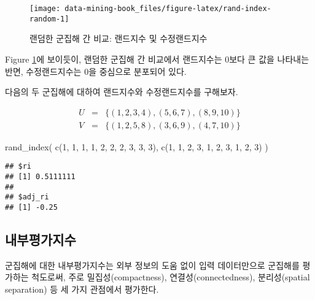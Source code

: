 \documentclass[
]{book}
\newenvironment{Shaded}{\begin{snugshade}}{\end{snugshade}}
\newcommand{\DecValTok}[1]{\textcolor[rgb]{0.00,0.00,0.81}{#1}}
\newcommand{\FunctionTok}[1]{\textcolor[rgb]{0.00,0.00,0.00}{#1}}
\newcommand{\NormalTok}[1]{#1}
\begin{document}
\begin{figure}

{\centering \texttt{[image: data-mining-book\_files/figure-latex/rand-index-random-1]} 

}

\caption{랜덤한 군집해 간 비교: 랜드지수 및 수정랜드지수}\label{fig:rand-index-random}
\end{figure}

Figure \ref{fig:rand-index-random}에 보이듯이, 랜덤한 군집해 간 비교에서 랜드지수는 0보다 큰 값을 나타내는 반면, 수정랜드지수는 0을 중심으로 분포되어 있다.

다음의 두 군집해에 대하여 랜드지수와 수정랜드지수를 구해보자.

\begin{eqnarray*}
U &=& \{(1, 2, 3, 4), (5, 6, 7), (8, 9, 10) \}\\
V &=& \{(1, 2, 5, 8), (3, 6, 9), (4, 7, 10) \}
\end{eqnarray*}

\begin{Shaded}
\begin{Highlighting}[]
\FunctionTok{rand\_index}\NormalTok{(}
  \FunctionTok{c}\NormalTok{(}\DecValTok{1}\NormalTok{, }\DecValTok{1}\NormalTok{, }\DecValTok{1}\NormalTok{, }\DecValTok{1}\NormalTok{, }\DecValTok{2}\NormalTok{, }\DecValTok{2}\NormalTok{, }\DecValTok{2}\NormalTok{, }\DecValTok{3}\NormalTok{, }\DecValTok{3}\NormalTok{, }\DecValTok{3}\NormalTok{),}
  \FunctionTok{c}\NormalTok{(}\DecValTok{1}\NormalTok{, }\DecValTok{1}\NormalTok{, }\DecValTok{2}\NormalTok{, }\DecValTok{3}\NormalTok{, }\DecValTok{1}\NormalTok{, }\DecValTok{2}\NormalTok{, }\DecValTok{3}\NormalTok{, }\DecValTok{1}\NormalTok{, }\DecValTok{2}\NormalTok{, }\DecValTok{3}\NormalTok{)}
\NormalTok{)}
\end{Highlighting}
\end{Shaded}

\begin{verbatim}
## $ri
## [1] 0.5111111
## 
## $adj_ri
## [1] -0.25
\end{verbatim}

\hypertarget{cluster-evaluation-internal-index}{%
\subsection{내부평가지수}\label{cluster-evaluation-internal-index}}

군집해에 대한 내부평가지수는 외부 정보의 도움 없이 입력 데이터만으로 군집해를 평가하는 척도로써, 주로 밀집성(compactness), 연결성(connectedness), 분리성(spatial separation) 등 세 가지 관점에서 평가한다.
\end{document}
